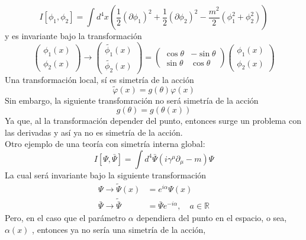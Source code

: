 \documentclass[../main.tex]{subfiles}
\begin{document}
\begin{equation}
  I[\phi_1,\phi_2] = \int d^4 x \left( \frac{1}{2} \left( \partial \phi_1 \right)^2 + \frac{1}{2} \left( \partial \phi_2 \right)^2 - \frac{m^2}{2} \left( \phi_1^2 + \phi_2^2 \right) \right)
 \end{equation}
 y es invariante bajo la transformación
 \begin{equation}
   \begin{pmatrix}
     \phi_1(x) \\
     \phi_2(x)
   \end{pmatrix}
   \longrightarrow
   \begin{pmatrix}
     \tilde{\phi_1}(x) \\
     \tilde{\phi_2}(x)
   \end{pmatrix}
  = 
   \begin{pmatrix}
     \cos{\theta} & -\sin{\theta} \\
     \sin{\theta} & \cos{\theta}
   \end{pmatrix}
   \begin{pmatrix}
     \phi_1(x) \\
     \phi_2(x)
   \end{pmatrix}
  \end{equation}
Una transformación local, sí es simetría de la acción 
\begin{equation}
  \tilde{\varphi}(x) = g(\theta)\varphi(x)
 \end{equation}
 Sin embargo, la siguiente transfomración no será simetría de la acción
 \begin{equation}
   g(\theta) = g(\theta(x))
  \end{equation}
Ya que, al la transformación depender del punto, entonces surge un problema con las derivadas y así ya no es simetría de la acción. \\
Otro ejemplo de una teoría con simetría interna global:
\begin{equation}
  I[\Psi,\bar{\Psi}] = \int d^4 \bar{\Psi} \left( i\gamma^\mu \partial_\mu - m \right)\Psi
 \end{equation}
 La cual será invariante bajo la siguiente transformación
 \begin{align*}
   \Psi \rightarrow \tilde{\Psi}(x)  & = e^{i\alpha} \Psi(x) \\
   \bar{\Psi} \rightarrow \tilde{\bar{\Psi}} & = \bar{\Psi}e^{-i\alpha},\quad a\in\mathbb{R}
 \end{align*}
Pero, en el caso que el parámetro $\alpha$ dependiera del punto en el espacio, o sea, $\alpha(x)$ , entonces ya no sería una simetría de la acción,
\end{document}
